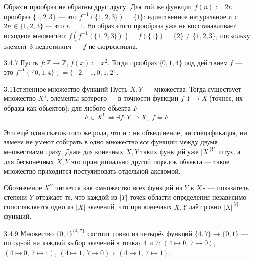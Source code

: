 \begin{remark}
Образ и прообраз не обратны друг другу. Для той же функции $f(n):=2n$ прообраз $\{1,2,3\}$ —
это $f^{-1}(\{1,2,3\})=\{1\}$: единственное натуральное $n$ с $2n\in\{1,2,3\}$ — это $n=1$. Но
образ этого прообраза уже не восстанавливает исходное множество:
$f(f^{-1}(\{1,2,3\}))=f(\{1\})=\{2\}\neq\{1,2,3\}$, поскольку элемент $3$ недостижим — $f$ не
сюръективна.
\end{remark}

\begin{example}{3.4.7}{}
Пусть $f:\mathbb{Z}\to\mathbb{Z}$, $f(x):=x^2$. Тогда прообраз $\{0,1,4\}$ под действием $f$
— это $f^{-1}(\{0,1,4\}) = \{-2,-1,0,1,2\}$.
\end{example}

\begin{axiom}{3.11}{степенное множество функций}
Пусть $X,Y$ — множества. Тогда существует множество $X^Y$, элементы которого — в точности
функции $f:Y\to X$ (точнее, их образы как объектов): для любого объекта $F$
\[
  F\in X^Y \iff \exists f:Y\to X,\; f=F.
\]
\end{axiom}

\begin{intuition}
Это ещё один скачок того же рода, что и : ни
объединение, ни спецификация, ни замена не умеют собирать в одно множество \emph{все}
функции между двумя множествами сразу. Даже для конечных $X,Y$ таких функций уже
$|X|^{|Y|}$ штук, а для бесконечных $X,Y$ это принципиально другой порядок объекта — такое
множество приходится постулировать отдельной аксиомой.
\end{intuition}

\begin{remark}
Обозначение $X^Y$ читается как «множество всех функций из $Y$ в $X$» — показатель степени
$Y$ отражает то, что каждой из $|Y|$ точек области определения независимо сопоставляется одно
из $|X|$ значений, что при конечных $X,Y$ даёт ровно $|X|^{|Y|}$ функций.
\end{remark}

\begin{example}{3.4.9}{}
Множество $\{0,1\}^{\{4,7\}}$ состоит ровно из четырёх функций $\{4,7\}\to\{0,1\}$ — по одной
на каждый выбор значений в точках $4$ и $7$: $(4\mapsto0,\,7\mapsto0)$,
$(4\mapsto0,\,7\mapsto1)$, $(4\mapsto1,\,7\mapsto0)$ и $(4\mapsto1,\,7\mapsto1)$.
\end{example}

